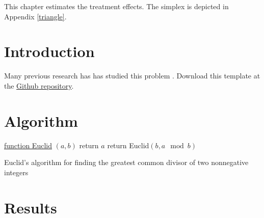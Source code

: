 This chapter estimates the treatment effects. \lipsum[75] The simplex is depicted in Appendix \ref{triangle}.

\section{Introduction}
Many previous research has has studied this problem \citep{Lee2018, DS2018}. Download this template at the \href{https://github.com/howardhsumail/Dissertation-LaTeX-Template.git}{Github repository}. \lipsum[79-80]

\section{Algorithm}
\lipsum[103]

\begin{algorithm}

  \underline{function Euclid} $(a,b)$\;
  {
  return $a$\;
  }
  {
  return Euclid$(b,a\mod b)$\;
  }
  \caption{Euclid's algorithm for finding the greatest common divisor of two nonnegative integers}
\end{algorithm}

\lipsum[104]

\section{Results}
\lipsum[67]

